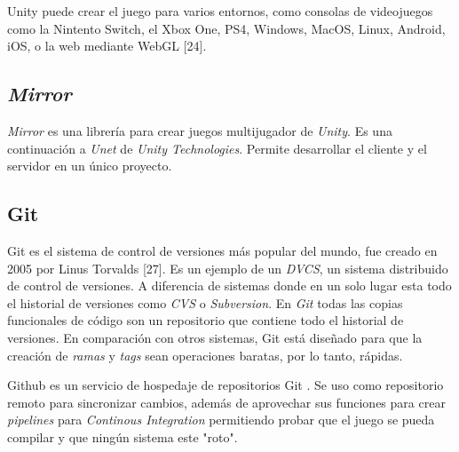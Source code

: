 Unity puede crear el juego para varios entornos, como consolas de videojuegos como la Nintento Switch, el Xbox One, PS4, Windows, MacOS, Linux, Android, iOS, o la web mediante WebGL [24].

\subsection{\textit{Mirror}}
\textit{Mirror} es una librería para crear juegos multijugador de \textit{Unity}. Es una continuación a \textit{Unet} de \textit{Unity Technologies}. Permite desarrollar el cliente y el servidor en un único proyecto.

\subsection{Git}
Git es el sistema de control de versiones más popular del mundo, fue creado en 2005 por Linus Torvalds [27]. Es un ejemplo de un \textit{DVCS}, un sistema distribuido de control de versiones. A diferencia de sistemas donde en un solo lugar esta todo el historial de versiones como \textit{CVS} o \textit{Subversion}. En \textit{Git} todas las copias funcionales de código son un repositorio que contiene todo el historial de versiones.
En comparación con otros sistemas, Git está diseñado para que la creación de \textit{ramas} y \textit{tags} sean operaciones baratas, por lo tanto, rápidas.

Github es un servicio de hospedaje de repositorios Git \cite{finley2012a}. Se uso como repositorio remoto para sincronizar cambios, además de aprovechar sus funciones para crear \textit{pipelines} para \textit{Continous Integration} permitiendo probar que el juego se pueda compilar y que ningún sistema este "roto".